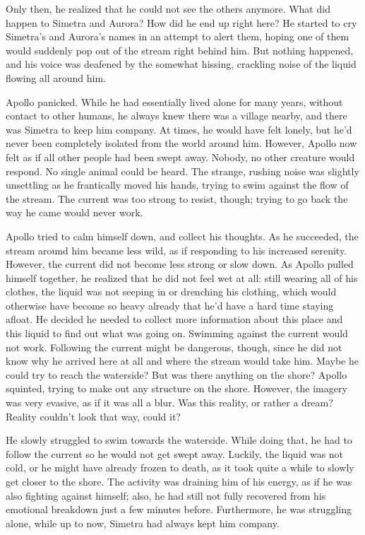 Only then, he realized that he could not see the others anymore. What did happen to Simetra and Aurora? How did he end up right here? He started to cry Simetra's and Aurora's names in an attempt to alert them, hoping one of them would suddenly pop out of the stream right behind him. But nothing happened, and his voice was deafened by the somewhat hissing, crackling noise of the liquid flowing all around him. 

Apollo panicked. While he had essentially lived alone for many years, without contact to other humans, he always knew there was a village nearby, and there was Simetra to keep him company. At times, he would have felt lonely, but he'd never been completely isolated from the world around him. However, Apollo now felt as if all other people had been swept away. Nobody, no other creature would respond. No single animal could be heard. The strange, rushing noise was slightly unsettling as he frantically moved his hands, trying to swim against the flow of the stream. The current was too strong to resist, though; trying to go back the way he came would never work.

Apollo tried to calm himself down, and collect his thoughts. As he succeeded, the stream around him became less wild, as if responding to his increased serenity. However, the current did not become less strong or slow down. As Apollo pulled himself together, he realized that he did not feel wet at all: still wearing all of his clothes, the liquid was not seeping in or drenching his clothing, which would otherwise have become so heavy already that he'd have a hard time staying afloat. He decided he needed to collect more information about this place and this liquid to find out what was going on. Swimming against the current would not work. Following the current might be dangerous, though, since he did not know why he arrived here at all and where the stream would take him. Maybe he could try to reach the waterside? But was there anything on the shore? Apollo squinted, trying to make out any structure on the shore. However, the imagery was very evasive, as if it was all a blur. Was this reality, or rather a dream? Reality couldn't look that way, could it? 

He slowly struggled to swim towards the waterside. While doing that, he had to follow the current so he would not get swept away. Luckily, the liquid was not cold, or he might have already frozen to death, as it took quite a while to slowly get closer to the shore. The activity was draining him of his energy, as if he was also fighting against himself; also, he had still not fully recovered from his emotional breakdown just a few minutes before. Furthermore, he was struggling alone, while up to now, Simetra had always kept him company.

